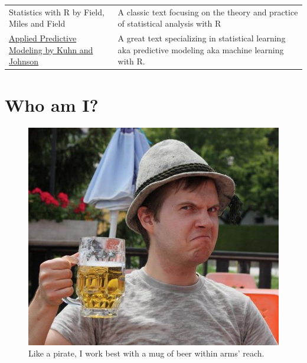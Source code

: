 \documentclass[]{book}
\theoremstyle{definition}
\theoremstyle{definition}
\theoremstyle{remark}
\begin{document}
\begin{longtable}[]{@{}ll@{}}
\begin{minipage}[t]{0.39\columnwidth}
{Statistics with R by Field, Miles and Field}\strut
\end{minipage} & \begin{minipage}[t]{0.48\columnwidth}\raggedright\strut
A classic text focusing on the theory and practice of statistical
analysis with R\strut
\end{minipage}\tabularnewline
\begin{minipage}[t]{0.39\columnwidth}\raggedright\strut
\href{https://www.amazon.com/Applied-Predictive-Modeling-Max-Kuhn/dp/1461468485/ref=sr_1_1?ie=UTF8\&qid=1487759459\&sr=8-1\&keywords=applied+predictive+modeling}{Applied
Predictive Modeling by Kuhn and Johnson}\strut
\end{minipage} & \begin{minipage}[t]{0.48\columnwidth}\raggedright\strut
A great text specializing in statistical learning aka predictive
modeling aka machine learning with R.\strut
\end{minipage}\tabularnewline
\bottomrule
\end{longtable}

\section{Who am I?}\label{who-am-i}

\begin{figure}

{\centering \includegraphics[width=7.49in]{images/beer} 

}

\caption{Like a pirate, I work best with a mug of beer within arms' reach.}\label{fig:unnamed-chunk-6}
\end{figure}
\end{document}
